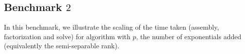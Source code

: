 \documentclass[final,leqno]{siamltex}
\begin{document}
\subsection{Benchmark $2$}
In this benchmark, we illustrate the scaling of the time taken (assembly, factorization and solve) for algorithm with $p$, the number of exponentials added (equivalently the semi-separable rank).

\begin{figure}[!htbp]
\end{figure}
\end{document}

